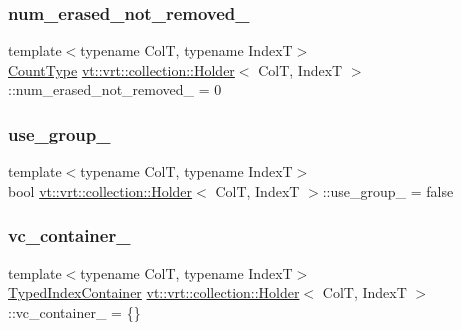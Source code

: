 \subsubsection{\texorpdfstring{num\+\_\+erased\+\_\+not\+\_\+removed\+\_\+}{num\_erased\_not\_removed\_}}
{\footnotesize\ttfamily template$<$typename ColT, typename IndexT$>$ \\
\hyperlink{structvt_1_1vrt_1_1collection_1_1_holder_a3251a556ac19fc7dc4d0bd388cfaedeb}{Count\+Type} \hyperlink{structvt_1_1vrt_1_1collection_1_1_holder}{vt\+::vrt\+::collection\+::\+Holder}$<$ ColT, IndexT $>$\+::num\+\_\+erased\+\_\+not\+\_\+removed\+\_\+ = 0\hspace{0.3cm}{\ttfamily [private]}}

\mbox{\label{structvt_1_1vrt_1_1collection_1_1_holder_ac897fcc83ba066a30cbf7b81e0283a1f}} 
\subsubsection{\texorpdfstring{use\+\_\+group\+\_\+}{use\_group\_}}
{\footnotesize\ttfamily template$<$typename ColT, typename IndexT$>$ \\
bool \hyperlink{structvt_1_1vrt_1_1collection_1_1_holder}{vt\+::vrt\+::collection\+::\+Holder}$<$ ColT, IndexT $>$\+::use\+\_\+group\+\_\+ = false\hspace{0.3cm}{\ttfamily [private]}}

\mbox{\label{structvt_1_1vrt_1_1collection_1_1_holder_ad41ddb379b9d88253ea822e5261fb541}} 
\subsubsection{\texorpdfstring{vc\+\_\+container\+\_\+}{vc\_container\_}}
{\footnotesize\ttfamily template$<$typename ColT, typename IndexT$>$ \\
\hyperlink{structvt_1_1vrt_1_1collection_1_1_holder_ae8d4ff940c971d52b237cf4d6049380a}{Typed\+Index\+Container} \hyperlink{structvt_1_1vrt_1_1collection_1_1_holder}{vt\+::vrt\+::collection\+::\+Holder}$<$ ColT, IndexT $>$\+::vc\+\_\+container\+\_\+ = \{\}\hspace{0.3cm}{\ttfamily [private]}}



